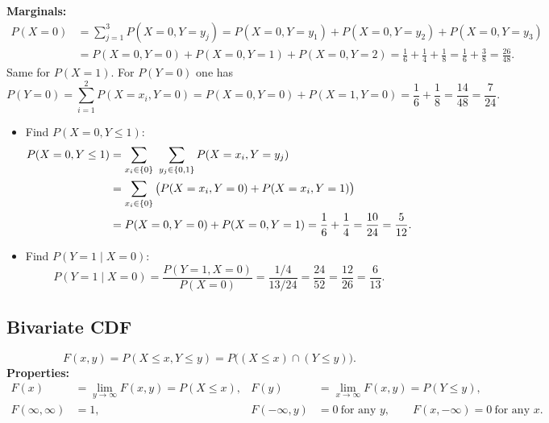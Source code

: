 \textbf{Marginals:}
\begin{align*}
P(X = 0) &= \sum_{j=1}^{3} P(X = 0, Y = y_j) = P(X=0, Y=y_1) + P(X=0, Y=y_2) + P(X=0, Y=y_3)\\
&= P(X=0, Y=0) + P(X=0, Y=1) + P(X=0, Y=2) = \frac16 + \frac14 + \frac18 = \frac16 + \frac38 = \frac{26}{48}.
\end{align*}
Same for $P(X = 1)$. For $P(Y = 0)$ one has
\[
P(Y = 0) = \sum_{i=1}^{2} P(X = x_i, Y = 0) = P(X=0, Y=0) + P(X=1, Y=0) = \frac16 + \frac18 = \frac{14}{48} = \frac{7}{24}.
\]

\begin{itemize}
\item Find $P(X = 0, Y \le 1)$:
\begin{align*}
P(X = 0, Y \le 1) &= \sum_{x_i \in \left\{0\right\}}\ \sum_{y_j \in \left\{0,1\right\}} P(X = x_i, Y = y_j)\\
&= \sum_{x_i \in \left\{0\right\}}\big(P(X = x_i, Y = 0) + P(X = x_i, Y = 1)\big)\\
&= P(X=0, Y=0) + P(X=0, Y=1) = \frac16 + \frac14 = \frac{10}{24} = \frac{5}{12}.
\end{align*}
\item Find $P(Y = 1 \mid X = 0)$:
\[
P(Y = 1 \mid X = 0) = \frac{P(Y = 1, X = 0)}{P(X = 0)} = \frac{1/4}{13/24} = \frac{24}{52} = \frac{12}{26} = \frac{6}{13}.
\]
\end{itemize}

\subsection{Bivariate CDF}
\[
F(x,y) = P(X \le x, Y \le y) = P\big((X \le x) \cap (Y \le y)\big).
\]
\textbf{Properties:}
\begin{align*}
F(x) &= \lim_{y \to \infty} F(x,y) = P(X \le x), & F(y) &= \lim_{x \to \infty} F(x,y) = P(Y \le y),\\
F(\infty,\infty) &= 1, & F(-\infty, y) &= 0 \ \text{for any } y, \qquad F(x, -\infty) = 0 \ \text{for any } x.
\end{align*}

